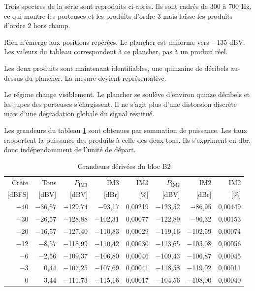 Trois spectres de la série sont reproduits ci-après. Ils sont cadrés de 300 à 700 Hz, ce qui montre les porteuses et les produits d'ordre 3 mais laisse les produits d'ordre 2 hors champ.


Rien n'émerge aux positions repérées. Le plancher est uniforme vers $-$135 dBV. Les valeurs du tableau correspondent à ce plancher, pas à un produit réel.


Les deux produits sont maintenant identifiables, une quinzaine de décibels au-dessus du plancher. La mesure devient représentative.


Le régime change visiblement. Le plancher se soulève d'environ quinze décibels et les jupes des porteuses s'élargissent. Il ne s'agit plus d'une distorsion discrète mais d'une dégradation globale du signal restitué.

Les grandeurs du tableau \ref{tab:imd_b2_derive} sont obtenues par sommation de puissance. Les taux rapportent la puissance des produits à celle des deux tons. Ils s'expriment en \gls{dbr}, donc indépendamment de l'unité de départ.

\begin{table}[H]
    \centering
    \caption{Grandeurs dérivées du bloc B2}
    \label{tab:imd_b2_derive}
    \small
    \begin{tabular}{rrrrrrrr}
        \toprule
        Crête    & Tons     & $P_\text{IM3}$ & IM3       & IM3     & $P_\text{IM2}$ & IM2       & IM2     \\
        {[dBFS]} & [dBV]    & [dBV]          & [dBr]     & [\%]    & [dBV]          & [dBr]     & [\%]    \\
        \midrule
        $-$40    & $-$36,57 & $-$129,74      & $-$93,17  & 0,00219 & $-$123,52      & $-$86,95  & 0,00449 \\
        $-$30    & $-$26,57 & $-$128,88      & $-$102,31 & 0,00077 & $-$122,89      & $-$96,32  & 0,00153 \\
        $-$20    & $-$16,57 & $-$127,40      & $-$110,83 & 0,00029 & $-$119,16      & $-$102,59 & 0,00074 \\
        $-$12    & $-$8,57  & $-$118,99      & $-$110,42 & 0,00030 & $-$113,65      & $-$105,08 & 0,00056 \\
        $-$6     & $-$2,56  & $-$109,37      & $-$106,80 & 0,00046 & $-$109,43      & $-$106,87 & 0,00045 \\
        $-$3     & 0,44     & $-$107,25      & $-$107,69 & 0,00041 & $-$118,58      & $-$119,02 & 0,00011 \\
        0        & 3,44     & $-$111,73      & $-$115,16 & 0,00017 & $-$104,56      & $-$108,00 & 0,00040 \\
        \bottomrule
    \end{tabular}
\end{table}

